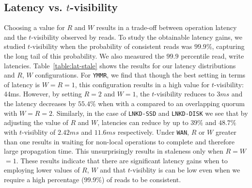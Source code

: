 \documentclass{vldb}
\begin{document}
\subsection{Latency vs. $t$-visibility}

Choosing a value for $R$ and $W$ results in a trade-off between
operation latency and the $t$-visibility observed by reads. To study
the obtainable latency gains, we studied $t$-visibility when the
probability of consistent reads was $99.9\%$, capturing the long tail
of this probability.  We also measured the $99.9$ percentile read,
write latencies.  Table~\ref{table:lat-stale} shows the results for
our latency distributions and $R$, $W$ configurations.  For
\texttt{YMMR}, we find that though the best setting in terms of
latency is $W$$=$$R$$=$$1$, this configuration results in a high value
for $t$-visibility: 44ms. However, by setting $R$$=$$2$ and $W$$=$$1$,
the $t$-visibility reduces to $3ms$ and the latency decreases by
$55.4\%$ when with a compared to an overlapping quorum with
$W$$=$$R$$=$$2$.  Similarly, in the case of \texttt{LNKD-SSD} and
\texttt{LNKD-DISK} we see that by adjusting the value of $R$ and $W$,
latencies can reduce by up to $39\%$ and $48.7\%$ with $t$-visiblity
of $2.42ms$ and $11.6ms$ respectively.  Under \texttt{WAN}, $R$ or $W$
greater than one results in waiting for non-local operations to
complete and therefore large propagation time.  This unsurprisingly
results in staleness only when $R$$=$$W$$=$$1$.  These results
indicate that there are significant latency gains when to employing
lower values of $R$, $W$ and that $t$-visiblity is can be low even
when we require a high percentage ($99.9\%$) of reads to be
consistent.
\end{document}
